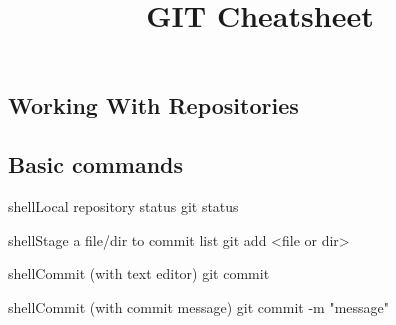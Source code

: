 \documentclass[10pt,a4paper]{article}
\title{\color{w3schools}GIT Cheatsheet
}
\begin{document}
\maketitle
\small
\begin{multicols}{3}

\thispagestyle{empty}
\scriptsize

% 




{\centering\section{Working With Repositories}}

\subsection{Basic commands}

\begin{codebox}{shell}{Local repository status}
git status

\end{codebox}

\begin{codebox}{shell}{Stage a file/dir to commit list}
git add <file or dir>

\end{codebox}

\begin{codebox}{shell}{Commit (with text editor)}
git commit

\end{codebox}

\begin{codebox}{shell}{Commit (with commit message)}
git commit -m "message"

\end{codebox}


\end{multicols}
\end{document}
